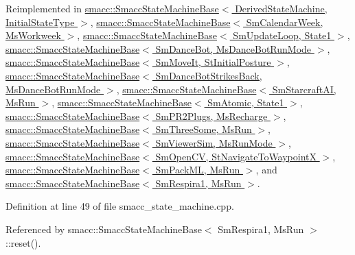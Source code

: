 Reimplemented in \hyperlink{structsmacc_1_1SmaccStateMachineBase_af34aec9fa012f0e3858131c84abfd5ed}{smacc\+::\+Smacc\+State\+Machine\+Base$<$ Derived\+State\+Machine, Initial\+State\+Type $>$}, \hyperlink{structsmacc_1_1SmaccStateMachineBase_af34aec9fa012f0e3858131c84abfd5ed}{smacc\+::\+Smacc\+State\+Machine\+Base$<$ Sm\+Calendar\+Week, Ms\+Workweek $>$}, \hyperlink{structsmacc_1_1SmaccStateMachineBase_af34aec9fa012f0e3858131c84abfd5ed}{smacc\+::\+Smacc\+State\+Machine\+Base$<$ Sm\+Update\+Loop, State1 $>$}, \hyperlink{structsmacc_1_1SmaccStateMachineBase_af34aec9fa012f0e3858131c84abfd5ed}{smacc\+::\+Smacc\+State\+Machine\+Base$<$ Sm\+Dance\+Bot, Ms\+Dance\+Bot\+Run\+Mode $>$}, \hyperlink{structsmacc_1_1SmaccStateMachineBase_af34aec9fa012f0e3858131c84abfd5ed}{smacc\+::\+Smacc\+State\+Machine\+Base$<$ Sm\+Move\+It, St\+Initial\+Posture $>$}, \hyperlink{structsmacc_1_1SmaccStateMachineBase_af34aec9fa012f0e3858131c84abfd5ed}{smacc\+::\+Smacc\+State\+Machine\+Base$<$ Sm\+Dance\+Bot\+Strikes\+Back, Ms\+Dance\+Bot\+Run\+Mode $>$}, \hyperlink{structsmacc_1_1SmaccStateMachineBase_af34aec9fa012f0e3858131c84abfd5ed}{smacc\+::\+Smacc\+State\+Machine\+Base$<$ Sm\+Starcraft\+A\+I, Ms\+Run $>$}, \hyperlink{structsmacc_1_1SmaccStateMachineBase_af34aec9fa012f0e3858131c84abfd5ed}{smacc\+::\+Smacc\+State\+Machine\+Base$<$ Sm\+Atomic, State1 $>$}, \hyperlink{structsmacc_1_1SmaccStateMachineBase_af34aec9fa012f0e3858131c84abfd5ed}{smacc\+::\+Smacc\+State\+Machine\+Base$<$ Sm\+P\+R2\+Plugs, Ms\+Recharge $>$}, \hyperlink{structsmacc_1_1SmaccStateMachineBase_af34aec9fa012f0e3858131c84abfd5ed}{smacc\+::\+Smacc\+State\+Machine\+Base$<$ Sm\+Three\+Some, Ms\+Run $>$}, \hyperlink{structsmacc_1_1SmaccStateMachineBase_af34aec9fa012f0e3858131c84abfd5ed}{smacc\+::\+Smacc\+State\+Machine\+Base$<$ Sm\+Viewer\+Sim, Ms\+Run\+Mode $>$}, \hyperlink{structsmacc_1_1SmaccStateMachineBase_af34aec9fa012f0e3858131c84abfd5ed}{smacc\+::\+Smacc\+State\+Machine\+Base$<$ Sm\+Open\+C\+V, St\+Navigate\+To\+Waypoint\+X $>$}, \hyperlink{structsmacc_1_1SmaccStateMachineBase_af34aec9fa012f0e3858131c84abfd5ed}{smacc\+::\+Smacc\+State\+Machine\+Base$<$ Sm\+Pack\+M\+L, Ms\+Run $>$}, and \hyperlink{structsmacc_1_1SmaccStateMachineBase_af34aec9fa012f0e3858131c84abfd5ed}{smacc\+::\+Smacc\+State\+Machine\+Base$<$ Sm\+Respira1, Ms\+Run $>$}.



Definition at line 49 of file smacc\+\_\+state\+\_\+machine.\+cpp.



Referenced by smacc\+::\+Smacc\+State\+Machine\+Base$<$ Sm\+Respira1, Ms\+Run $>$\+::reset().


